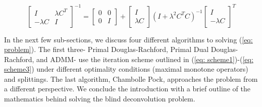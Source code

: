 \documentclass[12pt]{article}
\begin{document}
\begin{equation}
\begin{bmatrix}
I & \lambda C^T\\
-\lambda C & I
\end{bmatrix}^{-1} = \begin{bmatrix}
0 & 0\\
0 & I
\end{bmatrix} + \begin{bmatrix}
I\\
\lambda C
\end{bmatrix} (I + \lambda^2 C^TC)^{-1} \begin{bmatrix}
I\\
-\lambda C
\end{bmatrix}^T \label{eq: matrix resolvant}
\end{equation} 

In the next few sub-sections, we discuss four different algorithms to
solving (\ref{eq: problem}). The first three- Primal Douglas-Rachford,
Primal Dual Douglas-Rachford, and ADMM- use the iteration scheme
outlined in (\ref{eq: scheme1})-(\ref{eq: scheme3}) under different
optimality conditions (maximal monotone operators) and splittings. The
last algorithm, Chambolle Pock, approaches the problem from a
different perspective. We conclude the
introduction with a brief outline of the mathematics behind solving
the blind deconvolution problem. 
\end{document}
